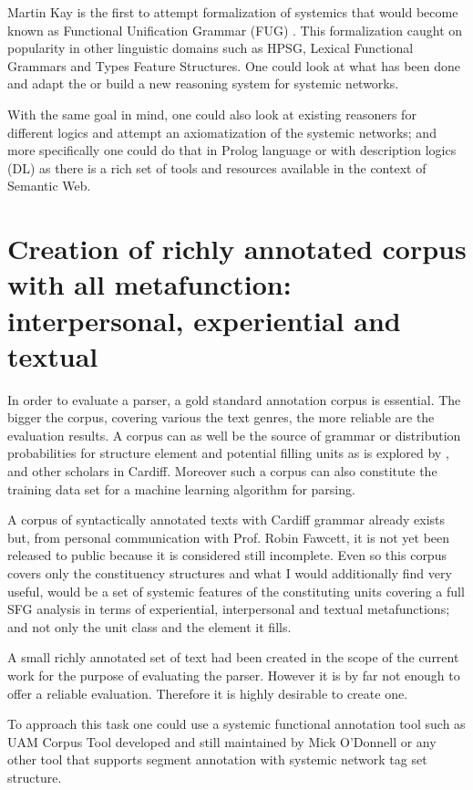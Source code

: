 Martin Kay is the first to attempt formalization of systemics that would become known as Functional Unification Grammar (FUG) \citep{Kay1985}. This formalization caught on popularity in other linguistic domains such as HPSG, Lexical Functional Grammars and Types Feature Structures. One could look at what has been done and adapt the or build a new reasoning system for systemic networks. 

With the same goal in mind, one could also look at existing reasoners for different logics and attempt an axiomatization of the systemic networks; and more specifically one could do that in Prolog language or with description logics (DL) as there is a rich set of tools and resources available in the context of Semantic Web.

\section{Creation of richly annotated corpus with all metafunction: interpersonal, experiential and textual}
In order to evaluate a parser, a gold standard annotation corpus is essential.  The bigger the corpus, covering various the text genres, the more reliable are the evaluation results. A corpus can as well be the source of grammar or distribution probabilities for structure element and potential filling units as is explored by \citet{Day2007}, \citet{Souter1996} and other scholars in Cardiff. Moreover such a corpus can also constitute the training data set for a machine learning algorithm for parsing.

A corpus of syntactically annotated texts with Cardiff grammar already exists but, from personal communication with Prof. Robin Fawcett, it is not yet been released to public because it is considered still incomplete. Even so this corpus covers only the constituency structures and what I would additionally find very useful, would be a set of systemic features of the constituting units covering a full SFG analysis in terms of experiential, interpersonal and textual metafunctions; and not only the unit class and the element it fills.

A small richly annotated set of text had been created in the scope of the current work for the purpose of evaluating the parser. However it is by far not enough to offer a reliable evaluation. Therefore it is highly desirable to create one. 

To approach this task one could use a systemic functional annotation tool such as UAM Corpus Tool \citep{ODonnell2008,ODonnell2008a} developed and still maintained by Mick O'Donnell or any other tool that supports segment annotation with systemic network tag set structure.

